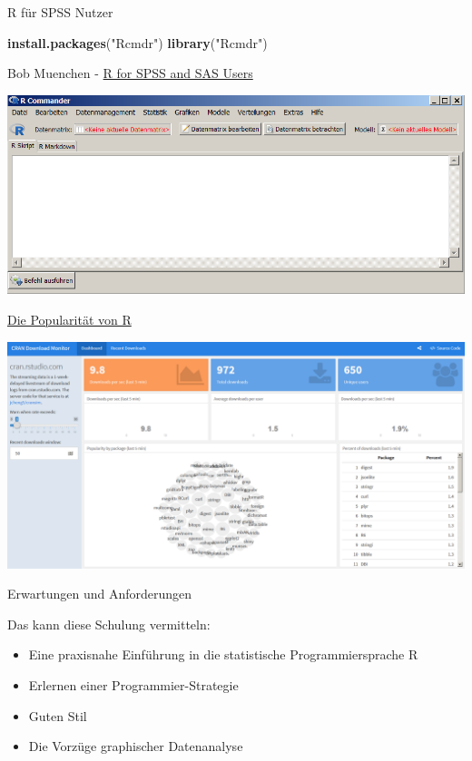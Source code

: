 \documentclass[
  ignorenonframetext,
]{beamer}
\newenvironment{Shaded}{\begin{snugshade}}{\end{snugshade}}
\newcommand{\KeywordTok}[1]{\textcolor[rgb]{0.26,0.66,0.93}{\textbf{#1}}}
\newcommand{\NormalTok}[1]{\textcolor[rgb]{0.74,0.68,0.62}{#1}}
\newcommand{\StringTok}[1]{\textcolor[rgb]{0.02,0.61,0.04}{#1}}
\providecommand{\tightlist}{%
  \setlength{\itemsep}{0pt}\setlength{\parskip}{0pt}}
\begin{document}
\begin{frame}[fragile]{R für SPSS Nutzer}
\protect\hypertarget{r-fur-spss-nutzer}{}

\begin{Shaded}
\begin{Highlighting}[]
\KeywordTok{install.packages}\NormalTok{(}\StringTok{"Rcmdr"}\NormalTok{)}
\KeywordTok{library}\NormalTok{(}\StringTok{"Rcmdr"}\NormalTok{)}
\end{Highlighting}
\end{Shaded}

Bob Muenchen -
\href{https://science.nature.nps.gov/im/datamgmt/statistics/r/documents/r_for_sas_spss_users.pdf}{R
for SPSS and SAS Users}

\includegraphics{figure/Rcommanderex.PNG}

\end{frame}

\begin{frame}{\href{https://gallery.shinyapps.io/cran-gauge/}{Die
Popularität von R}}
\protect\hypertarget{die-popularitat-von-r}{}

\includegraphics{figure/CRANdownloads.PNG}

\end{frame}

\begin{frame}{Erwartungen und Anforderungen}
\protect\hypertarget{erwartungen-und-anforderungen}{}

Das kann diese Schulung vermitteln:

\begin{itemize}
\tightlist
\item
  Eine praxisnahe Einführung in die statistische Programmiersprache R
\item
  Erlernen einer Programmier-Strategie
\item
  Guten Stil
\item
  Die Vorzüge graphischer Datenanalyse
\end{itemize}

\end{frame}
\end{document}

